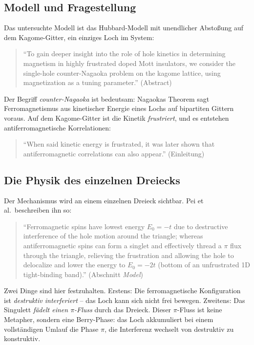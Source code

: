 \subsection{Modell und Fragestellung}

Das untersuchte Modell ist das Hubbard-Modell mit unendlicher Abstoßung auf
dem Kagome-Gitter, ein einziges Loch im System:
\begin{quote}\QM
\enquote{To gain deeper insight into the role of hole kinetics in determining
magnetism in highly frustrated doped Mott insulators, we consider the
single-hole counter-Nagaoka problem on the kagome lattice, using magnetization
as a tuning parameter.} (Abstract)
\end{quote}
Der Begriff \emph{counter-Nagaoka} ist bedeutsam: Nagaokas Theorem sagt
Ferromagnetismus aus kinetischer Energie eines Lochs auf bipartiten Gittern
voraus. Auf dem Kagome-Gitter ist die Kinetik \emph{frustriert}, und es
entstehen antiferromagnetische Korrelationen:
\begin{quote}\QM
\enquote{When said kinetic energy is frustrated, it was later shown that
antiferromagnetic correlations can also appear.} (Einleitung)
\end{quote}

\subsection{Die Physik des einzelnen Dreiecks}

Der Mechanismus wird an einem einzelnen Dreieck sichtbar. Pei et al.\
beschreiben ihn so:
\begin{quote}\QM
\enquote{Ferromagnetic spins have lowest energy $E_0=-t$ due to destructive
interference of the hole motion around the triangle; whereas antiferromagnetic
spins can form a singlet and effectively thread a $\pi$ flux through the
triangle, relieving the frustration and allowing the hole to delocalize and
lower the energy to $E_0=-2t$ (bottom of an unfrustrated 1D tight-binding
band).} (Abschnitt \emph{Model})
\end{quote}
Zwei Dinge sind hier festzuhalten. Erstens: Die ferromagnetische
Konfiguration ist \emph{destruktiv interferiert} -- das Loch kann sich nicht
frei bewegen. Zweitens: Das Singulett \emph{fädelt einen $\pi$-Fluss} durch
das Dreieck. Dieser $\pi$-Fluss ist keine Metapher, sondern eine Berry-Phase:
das Loch akkumuliert bei einem vollständigen Umlauf die Phase $\pi$, die
Interferenz wechselt von destruktiv zu konstruktiv.

